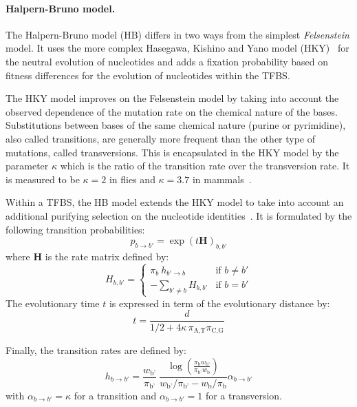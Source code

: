 \documentclass[a4,center,fleqn]{NAR}
\newcommand{\pa}{\pi_\textrm{A,T}}
\newcommand{\pc}{\pi_\textrm{C,G}}
\newcommand{\pbbis}{\pi_\textrm{b}}
\newcommand{\pbp}{\pi_\textrm{b'}}
\newcommand{\wb}{w_\textrm{b}}
\newcommand{\wbp}{w_\textrm{b'}}
\begin{document}
\paragraph{Halpern-Bruno model. }
The Halpern-Bruno model (HB) \cite{Halpern:1998qf} differs in two ways from the
simplest {\em Felsenstein} model.
It uses  the more complex Hasegawa, Kishino and Yano model
(HKY)~\cite{Hasegawa:1985dp} for the neutral evolution of nucleotides and adds
a fixation probability based on fitness differences for the evolution of
nucleotides within the TFBS.

The HKY model  improves on the Felsenstein model by taking into account the
observed dependence of the mutation rate on the chemical nature of the bases. 
Substitutions between bases of the same chemical nature (purine or pyrimidine),
also called transitions, are generally more frequent than the other type of
mutations, called transversions.
This is encapsulated in the HKY model by the parameter $\kappa$ which is the
ratio of the transition rate over the transversion rate.
It is measured to be $\kappa=2$ in flies and $\kappa=3.7$ in
mammals~\cite{kappa12paper}.  

Within a TFBS, the HB model extends the HKY model to take into account an
additional purifying selection on the nucleotide
identities~\cite{Halpern:1998qf}. 
It is formulated by the following transition probabilities:
\begin{equation}
   p_{b\rightarrow b'}=\exp(t\mathbf{H})_{b,b'}
   \label{HB-integr}
\end{equation}
where $\mathbf{H}$ is the rate matrix defined by:
\begin{equation}
	H_{b,b'} =
	\begin{cases}
		\pi_{b}\ h_{b'\to b} & \text{if } b\neq b'\\
		- \sum_{b'\neq b} H_{b,b'} & \text{if } b = b'
	\end{cases}
   \label{HB-transi}
\end{equation}
The evolutionary time $t$ is expressed in term of the evolutionary distance by:
\begin{equation}
t=\frac{d}{1/2+4\kappa\, \pa\pc}
    \label{rateHKY}
\end{equation}

Finally, the transition rates are defined by:
\begin{equation}
   h_{b\rightarrow b'}=\frac{\wbp}{\pbp}\ \frac{\log\left(\frac{\pbbis \wbp}{\pbp \wb} \right)}{\wbp / \pbp - \wb / \pbbis} \alpha_{b\rightarrow b'}
   \label{fixation-prob-HB model}
\end{equation}
with $\alpha_{b\rightarrow b'}=\kappa$ for a transition and
$\alpha_{b\rightarrow b'}=1$ for a transversion.
\end{document}
